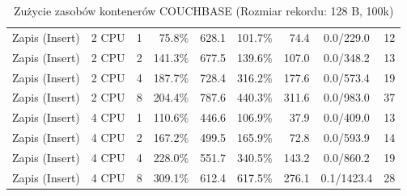 \begin{table}[ht]
{\begin{tabular}{llcrrrrcc}
Zapis (Insert) & 2 CPU & 1 & 75.8\% & 628.1 & 101.7\% & 74.4 & 0.0/229.0 & 12 \\
Zapis (Insert) & 2 CPU & 2 & 141.3\% & 677.5 & 139.6\% & 107.0 & 0.0/348.2 & 13 \\
Zapis (Insert) & 2 CPU & 4 & 187.7\% & 728.4 & 316.2\% & 177.6 & 0.0/573.4 & 19 \\
Zapis (Insert) & 2 CPU & 8 & 204.4\% & 787.6 & 440.3\% & 311.6 & 0.0/983.0 & 37 \\
Zapis (Insert) & 4 CPU & 1 & 110.6\% & 446.6 & 106.9\% & 37.9 & 0.0/409.0 & 13 \\
Zapis (Insert) & 4 CPU & 2 & 167.2\% & 499.5 & 165.9\% & 72.8 & 0.0/593.9 & 14 \\
Zapis (Insert) & 4 CPU & 4 & 228.0\% & 551.7 & 340.5\% & 143.2 & 0.0/860.2 & 19 \\
Zapis (Insert) & 4 CPU & 8 & 309.1\% & 612.4 & 617.5\% & 276.1 & 0.1/1423.4 & 28 \\
\bottomrule
\end{tabular}%
}
\caption{Zużycie zasobów kontenerów COUCHBASE (Rozmiar rekordu: 128 B, 100k)}
\label{tab:resources_couchbase_small_100000}
\end{table}
